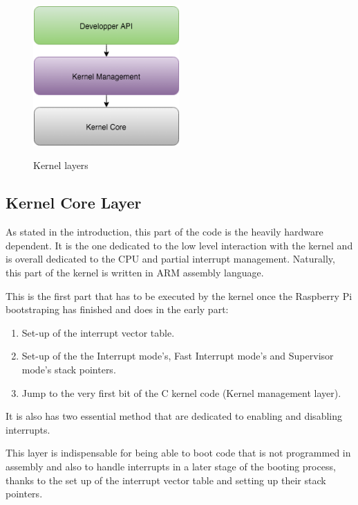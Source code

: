 \begin{figure}[H]
\begin{center}
\includegraphics[width=0.5\textwidth]{includes/figures/chapter5_kernel_layers.png}  \\[0.5 cm]
\caption{Kernel layers}
\end{center}
\label{fig:chapter5_kernel_layers}
\end{figure}


\subsection{Kernel Core Layer}
As stated in the introduction, this part of the code is the heavily hardware dependent. It is the one dedicated to the low level interaction with the kernel and is overall dedicated to the CPU and partial interrupt management. Naturally, this part of the kernel is written in ARM assembly language.

This is the first part that has to be executed by the kernel once the Raspberry Pi bootstraping has finished and does in the early part:
\begin{enumerate}
	\item Set-up of the interrupt vector table.
	\item Set-up of the the Interrupt mode's, Fast Interrupt mode's and Supervisor mode's stack pointers.
	\item Jump to the very first bit of the C kernel code (Kernel management layer).
\end{enumerate}


It is also has two essential method that are dedicated to enabling and disabling interrupts.


This layer is indispensable for being able to boot code that is not programmed in assembly and also to handle interrupts in a later stage of the booting process, thanks to the set up of the interrupt vector table and setting up their stack pointers.




